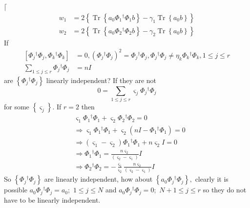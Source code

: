 \documentclass[aps,preprint]{revtex4}%
\begin{document}
$\lceil$%
\begin{align}
w_{1}  &  =2\left\{  \operatorname{Tr}\left\{  a_{0}\Phi_{1}{}^{\dagger}%
\Phi_{1}b\right\}  -\gamma_{1}\operatorname{Tr}\left\{  a_{0}b\right\}
\right\} \\
w_{2}  &  =2\left\{  \operatorname{Tr}\left\{  a_{0}\Phi_{2}{}^{\dagger}%
\Phi_{2}b\right\}  -\gamma_{2}\operatorname{Tr}\left\{  a_{0}b\right\}
\right\}
\end{align}
If
\begin{align}
\left[  \Phi_{j}{}^{\dagger}\Phi_{j},\Phi_{k}{}^{\dagger}\Phi_{k}\right]   &
=0,\left(  \Phi_{j}{}^{\dagger}\Phi_{j}\right)  ^{2}=\Phi_{j}{}^{\dagger}%
\Phi_{j},\Phi_{j}{}^{\dagger}\Phi_{j}\neq\eta_{k}\Phi_{k}{}^{\dagger}\Phi
_{k},1\leq j\leq r\\
\sum\limits_{1\leq j\leq r}\Phi_{j}{}^{\dagger}\Phi_{j}  &  =nI
\end{align}
are $\left\{  \Phi_{j}{}^{\dagger}\Phi_{j}\right\}  $ linearly independent? If
they are not
\begin{equation}
0=\sum\limits_{1\leq j\leq r}\varsigma_{j}\Phi_{j}{}^{\dagger}\Phi_{j}%
\end{equation}
for some $\left\{  \varsigma_{j}\right\}  .$ If $r=2$ then
\begin{align}
&  \varsigma_{1}\Phi_{1}{}^{\dagger}\Phi_{1}+\varsigma_{2}\Phi_{2}{}^{\dagger
}\Phi_{2}=0\\
&  \Rightarrow\varsigma_{1}\Phi_{1}{}^{\dagger}\Phi_{1}+\varsigma_{2}\left(
nI-\Phi_{1}{}^{\dagger}\Phi_{1}\right)  =0\\
&  \Rightarrow\left(  \varsigma_{1}-\varsigma_{2}\right)  \Phi_{1}{}^{\dagger
}\Phi_{1}+n\varsigma_{2}I=0\\
&  \Rightarrow\Phi_{1}{}^{\dagger}\Phi_{1}=\frac{n\varsigma_{2}}{\left(
\varsigma_{2}-\varsigma_{1}\right)  }I\\
&  \Rightarrow\Phi_{2}{}^{\dagger}\Phi_{2}=-\frac{\varsigma_{1}}{\varsigma
_{2}}\frac{n\varsigma_{2}}{\left(  \varsigma_{2}-\varsigma_{1}\right)  }I
\end{align}
So $\left\{  \Phi_{j}{}^{\dagger}\Phi_{j}\right\}  $ are linearly independent,
how about $\left\{  a_{0}\Phi_{j}{}^{\dagger}\Phi_{j}\right\}  ,$ clearly it
is possible $a_{0}\Phi_{j}{}^{\dagger}\Phi_{j}=a_{0};$ $1\leq j\leq N$ and
$a_{0}\Phi_{j}{}^{\dagger}\Phi_{j}=0;$ $N+1\leq j\leq r$ so they do not have
to be linearly independent.
\end{document}
